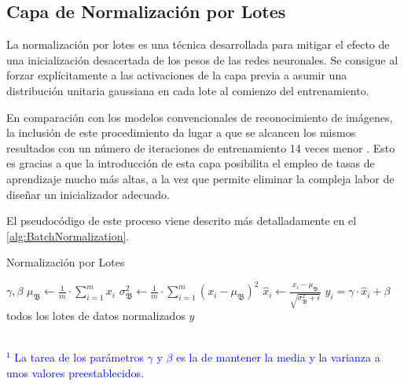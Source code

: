 \subsection{Capa de Normalización por Lotes}

La normalización por lotes es una técnica desarrollada para mitigar el efecto de una inicialización desacertada de los pesos de las redes neuronales. Se consigue al forzar explícitamente a las activaciones de la capa previa a asumir una distribución unitaria gaussiana en cada lote al comienzo del entrenamiento.

En comparación con los modelos convencionales de reconocimiento de imágenes, la inclusión de este procedimiento da lugar a que se alcancen los mismos resultados con un número de iteraciones de entrenamiento 14 veces menor \cite{BatchNormalization}. Esto es gracias a que la introducción de esta capa posibilita el empleo de tasas de aprendizaje mucho más altas, a la vez que permite eliminar la compleja labor de diseñar un inicializador adecuado.

El pseudocódigo de este proceso viene descrito más detalladamente en el \autoref{alg:BatchNormalization}.

\begin{algorithm}
\caption{Normalización por Lotes \cite{BatchNormalization}}
\label{alg:BatchNormalization}
\begin{algorithmic}[1]
        \State \VARIABLES $\gamma, \beta$ \textcolor{blue}{\footnotemark[1]} 
        \Repeat
                \State $\mu_\mathfrak{B} \gets \frac{1}{m}\cdot \sum\limits_{i=1}^{m} x_i$ 
                \State $\sigma_\mathfrak{B}^{2} \gets \frac{1}{m}\cdot \sum\limits_{i=1}^{m} (x_i - \mu_\mathfrak{B})^2 $ 
                \State $\hat{x}_i \gets \frac{x_i - \mu_\mathfrak{B}}{\sqrt{\sigma_\mathfrak{B}^{2} + \epsilon}}$
                \State $y_i = \gamma \cdot \hat{x}_i + \beta$
            \EndFor
        \Until todos los lotes de datos normalizados
        \State \Return $y$
    \EndFunction
\end{algorithmic}
\textcolor{blue}{\footnotesize{\\ $^1$ La tarea de los parámetros $ \gamma $ y $\beta$ es la de mantener la media y la varianza a unos valores preestablecidos.}}
\end{algorithm}

